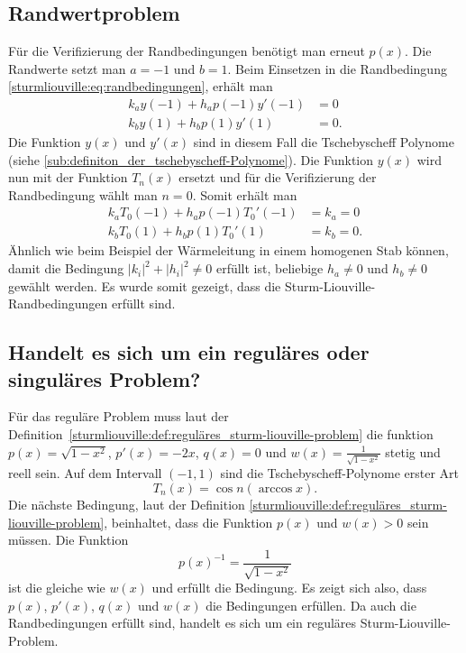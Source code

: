 \subsection*{Randwertproblem}
Für die Verifizierung der Randbedingungen benötigt man erneut $p(x)$.
Die Randwerte setzt man $a = -1$ und $b = 1$.
Beim Einsetzen in die Randbedingung \eqref{sturmliouville:eq:randbedingungen},
erhält man
\begin{equation}
	\begin{aligned}
		k_a y(-1) + h_a p(-1) y'(-1) &= 0\\
		k_b y(1) + h_b p(1) y'(1) &= 0.
	\end{aligned} 
\end{equation}
Die Funktion $y(x)$ und $y'(x)$ sind in diesem Fall die Tschebyscheff Polynome
(siehe \ref{sub:definiton_der_tschebyscheff-Polynome}).
Die Funktion $y(x)$ wird nun mit der Funktion $T_n(x)$ ersetzt und für die
Verifizierung der Randbedingung wählt man $n=0$.
Somit erhält man
\begin{equation}
	\begin{aligned}
		k_a T_0(-1) + h_a p(-1) T_{0}'(-1) &= k_a = 0\\
		k_b T_0(1) + h_b p(1) T_{0}'(1) &= k_b = 0.
	\end{aligned}
\end{equation}
Ähnlich wie beim Beispiel der Wärmeleitung in einem homogenen Stab können,
damit die Bedingung $|k_i|^2 + |h_i|^2\ne 0$ erfüllt ist, beliebige
$h_a \ne 0$ und $h_b \ne 0$ gewählt werden.
Es wurde somit gezeigt, dass die Sturm-Liouville-Randbedingungen erfüllt sind.

\subsection*{Handelt es sich um ein reguläres oder singuläres Problem?}
Für das reguläre Problem muss laut der
Definition~\ref{sturmliouville:def:reguläres_sturm-liouville-problem} die funktion
$p(x) = \sqrt{1-x^2}$, $p'(x) = -2x$, $q(x) = 0$ und
$w(x) = \frac{1}{\sqrt{1-x^2}}$ stetig und reell sein.
Auf dem Intervall $(-1,1)$ sind die Tschebyscheff-Polynome erster Art
\begin{equation}
	T_n(x)
	=
	\cos n (\arccos x).
\end{equation}
Die nächste Bedingung, laut der Definition \ref{sturmliouville:def:reguläres_sturm-liouville-problem}, beinhaltet, dass die Funktion $p(x)$ und $w(x)>0$ sein
müssen.
Die Funktion
\begin{equation*}
	p(x)^{-1} = \frac{1}{\sqrt{1-x^2}}
\end{equation*}
ist die gleiche wie $w(x)$ und erfüllt die Bedingung.
Es zeigt sich also, dass $p(x)$, $p'(x)$, $q(x)$ und $w(x)$
die Bedingungen erfüllen.
Da auch die Randbedingungen erfüllt sind, handelt es sich um ein reguläres Sturm-Liouville-Problem.



